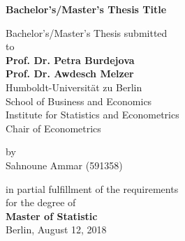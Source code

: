 \begin{center}

    {\Large{\bf Bachelor's/Master's Thesis Title}} \vspace{0.5cm}


    {\normalsize Bachelor's/Master's Thesis submitted\\\vspace{0.5cm}
    to}\\\vspace{0.5cm}
    {\normalsize{\bf Prof. Dr. Petra Burdejova}} \\\vspace{0.5cm}
    {\normalsize{\bf Prof. Dr. Awdesch Melzer}} \\\vspace{0.5cm}
    {\normalsize Humboldt-Universit\"at zu Berlin \\
    School of Business and Economics \\
    Institute for Statistics and Econometrics \\
    Chair of Econometrics} \vspace{1cm}


    {\normalsize by \\\vspace{0.5cm}
     Sahnoune Ammar
    (591358)} \vspace{1cm}


    {\normalsize in partial fulfillment of the requirements \\
    for the degree of \\
    {\bf Master of Statistic} \\
    Berlin, August 12, 2018}

\end{center}
